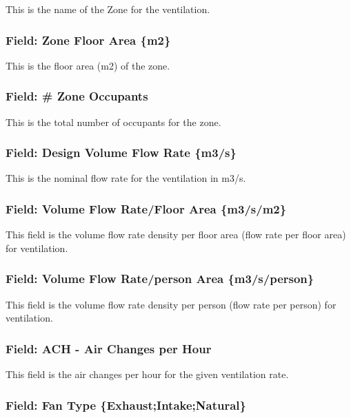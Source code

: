 This is the name of the Zone for the ventilation.

\subsubsection{Field: Zone Floor Area \{m2\}}\label{field-zone-floor-area-m2-6}

This is the floor area (m2) of the zone.

\subsubsection{Field: \# Zone Occupants}\label{field-zone-occupants-6}

This is the total number of occupants for the zone.

\subsubsection{Field: Design Volume Flow Rate \{m3/s\}}\label{field-design-volume-flow-rate-m3s-1}

This is the nominal flow rate for the ventilation in m3/s.

\subsubsection{Field: Volume Flow Rate/Floor Area \{m3/s/m2\}}\label{field-volume-flow-ratefloor-area-m3sm2-1}

This field is the volume flow rate density per floor area (flow rate per floor area) for ventilation.

\subsubsection{Field: Volume Flow Rate/person Area \{m3/s/person\}}\label{field-volume-flow-rateperson-area-m3sperson}

This field is the volume flow rate density per person (flow rate per person) for ventilation.

\subsubsection{Field: ACH - Air Changes per Hour}\label{field-ach---air-changes-per-hour-1}

This field is the air changes per hour for the given ventilation rate.

\subsubsection{Field: Fan Type \{Exhaust;Intake;Natural\}}\label{field-fan-type-exhaustintakenatural}

